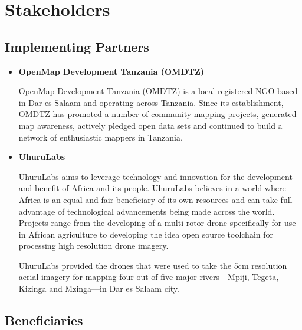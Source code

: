 \documentclass[a4paper,12pt,twoside]{article}
\begin{document}
\section{Stakeholders}

\subsection{Implementing Partners}

    \begin{itemize}
        \item \textbf{OpenMap Development Tanzania (OMDTZ)} %
    
        OpenMap Development Tanzania (OMDTZ) is a local registered NGO based in Dar es Salaam and operating across Tanzania. Since its establishment, OMDTZ has promoted a number of community mapping projects, generated map awareness, actively pledged open data sets and continued to build a network of enthusiastic mappers in Tanzania.
    
        \item \textbf{UhuruLabs}
    
        UhuruLabs aims to leverage technology and innovation for the development and benefit of Africa and its people. UhuruLabs believes in a world where Africa is an equal and fair beneficiary of its own resources and can take full advantage of technological advancements being made across the world. Projects range from the developing of a multi-rotor drone specifically for use in African agriculture to developing the idea open source toolchain for processing high resolution drone imagery. 
    
        UhuruLabs provided the drones that were used to take the 5cm resolution aerial imagery for mapping four out of five major rivers---Mpiji, Tegeta, Kizinga and Mzinga---in Dar es Salaam city. %
    
    \end{itemize}

\subsection{Beneficiaries}
\end{document}

